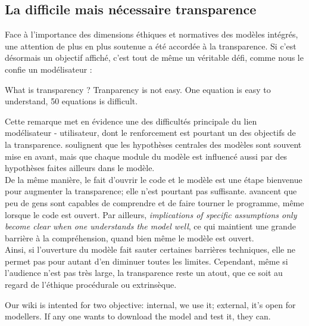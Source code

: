 \subsection{La difficile mais nécessaire transparence}

Face à l'importance des dimensions éthiques et normatives des modèles intégrés, une attention de plus en plus soutenue a été accordée à la transparence.  Si c'est désormais un objectif affiché, c'est tout de même un véritable défi, comme nous le confie un modélisateur : 

\begin{authoredquote}
    What is transparency ? Tranparency is not easy. One equation is easy to understand, 50 equations is difficult. 
\end{authoredquote}

Cette remarque met en évidence une des difficultés principale du lien modélisateur - utilisateur, dont le renforcement est pourtant un des objectifs de la transparence. \textcite{keppo_exploring_2021} soulignent que les hypothèses centrales des modèles sont souvent mise en avant, mais que chaque module du modèle est influencé  aussi par des hypothèses faites ailleurs dans le modèle. \\

De la même manière, le fait d'ouvrir le code et le modèle est une étape bienvenue pour augmenter la transparence; elle n'est pourtant pas suffisante. \textcite{keppo_exploring_2021} avancent que peu de gens sont capables de comprendre et de faire tourner le programme, même lorsque le code est ouvert. Par ailleurs, \emph{implications of specific assumptions only become clear when one understands the model well}, ce qui maintient une grande barrière à la compréhension, quand bien même le modèle est ouvert. \\

Ainsi, si l'ouverture du modèle fait sauter certaines barrières techniques, elle ne permet pas pour autant d'en diminuer toutes les limites. Cependant, même si l'audience n'est pas très large, la transparence reste un atout, que ce soit au regard de l'éthique procédurale ou extrinsèque. 



\begin{authoredquote}
Our wiki is intented for two objective: internal, we use it; external, it's open for modellers. If any one wants to download the model and test it, they can. 
\end{authoredquote}

